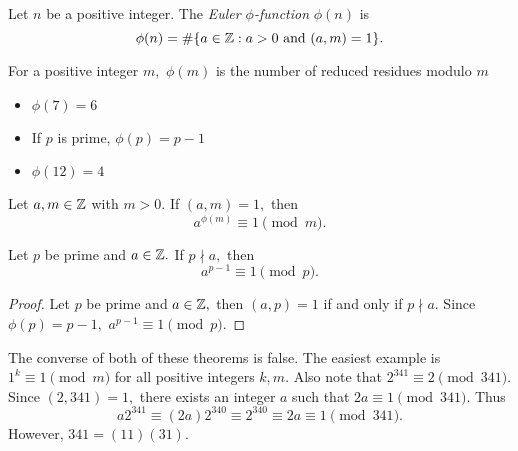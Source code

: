 \documentclass{ximera}
\begin{document}
\begin{defn}\label{defn:phi-fn}
    Let $n$ be a positive integer. The \emph{Euler $\phi$-function} $\phi(n)$ is \[\phi(n)=\#\{a\in\mathbb Z : a>0 \textnormal{ and } (a,m)=1\}.\]
\end{defn}


\begin{remark}
    For a positive integer $m,$ $\phi(m)$ is the number of reduced residues modulo $m$
\end{remark}
\begin{example}\label{example:phi}
    
    \begin{itemize}
        \item $\phi(7)=6$
        
        \item If $p$ is prime, $\phi(p)=p-1$
        
        \item $\phi(12)=4$
    \end{itemize}
\end{example}

\begin{theorem}\label{thm:euler-FlT}
    Let $a,m\in\mathbb Z$ with $m>0.$ If $(a,m)=1,$ then \[a^{\phi(m)}\equiv 1\pmod{m}.\]
\end{theorem}



\begin{corollary}\label{FlT}
    Let $p$ be prime and $a\in\mathbb Z.$ If $p\nmid a,$ then \[a^{p-1}\equiv 1\pmod{p}.\]

    \begin{proof}
        Let $p$ be prime and $a\in\mathbb Z,$ then $(a,p)=1$ if and only if $p\nmid a.$ Since $\phi(p)=p-1,$ $a^{p-1}\equiv 1\pmod{p}.$
    \end{proof}
\end{corollary}

\begin{warning}
    The converse of both of these theorems is false. The easiest example is $1^k\equiv 1\pmod{m}$ for all positive integers $k, m$. Also note that $2^{341}\equiv 2\pmod{341}$. Since $(2,341)=1,$ there exists an integer $a$ such that $2a\equiv 1\pmod{341}.$ Thus \[a2^{341}\equiv (2a)2^{340}\equiv 2^{340}\equiv 2a\equiv 1\pmod{341}.\]
    However, $341=(11)(31).$
\end{warning}
\end{document}
